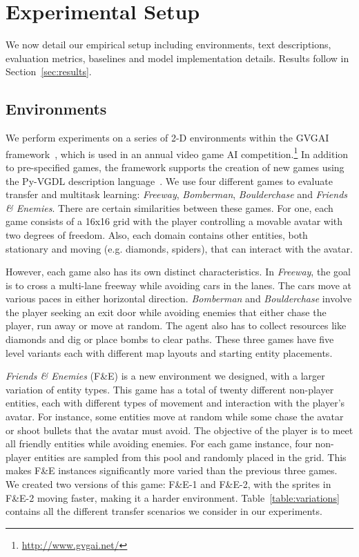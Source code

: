 \section{Experimental Setup}
\label{sec:experiments}
We now detail our empirical setup including environments, text descriptions, evaluation metrics, baselines and model implementation details. Results follow in Section~\ref{sec:results}.

\subsection{Environments}
We perform experiments on a series of 2-D environments within the GVGAI framework~\cite{perez2016general}, which is used in an annual video game AI competition.\footnote{\url{http://www.gvgai.net/}} In addition to pre-specified games, the framework supports the creation of new games using the Py-VGDL description language~\cite{schaul2013video}. We use four different games to evaluate transfer and multitask learning: \emph{Freeway}, \emph{Bomberman}, \emph{Boulderchase} and \emph{Friends \& Enemies}. There are certain similarities between these games. For one, each game consists of a 16x16 grid with the player controlling a movable avatar with two degrees of freedom. Also, each domain contains other entities, both stationary and moving (e.g. diamonds, spiders), that can interact with the avatar. 

However, each game also has its own distinct characteristics. In \emph{Freeway}, the goal is to cross a multi-lane freeway while avoiding cars in the lanes. The cars move at various paces in either horizontal direction. \emph{Bomberman} and \emph{Boulderchase} involve the player seeking an exit door while avoiding enemies that either chase the player, run away or move at random. The agent also has to collect resources like diamonds and dig or place bombs to clear paths. These three games have five level variants each with different map layouts and starting entity placements. 

\emph{Friends \& Enemies} (F\&E) is a new environment we designed, with a larger variation of entity types. This game has a total of twenty different non-player entities, each with different types of movement and interaction with the player's avatar. For instance, some entities move at random while some chase the avatar or shoot bullets that the avatar must avoid. The objective of the player is to meet all friendly entities while avoiding enemies. For each game instance, four non-player entities are sampled from this pool and randomly placed in the grid. This makes F\&E instances significantly more varied than the previous three games.  We created two versions of this game: F\&E-1 and F\&E-2, with the sprites in F\&E-2 moving faster, making it a harder environment. Table~\ref{table:variations} contains all the different transfer scenarios we consider in our experiments. 

